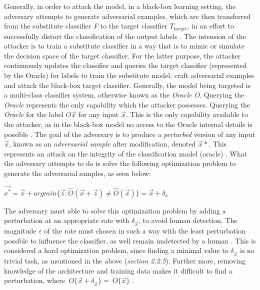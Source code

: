 \documentclass[grad,lot,lof,11pt,oneside,onehalfspace]{RUthesis}
\begin{document}
Generally, in order to attack the model, in a black-box learning setting, the adversary attempts to generate adversarial examples, which are then transferred from the substitute classifier \textit{F} to the target classifier \textit{$T_{target}$}, in an effort to successfully distort the classification of the output labels \cite{hosseini_blocking_2017}. The intension of the attacker is to train a substitute classifier in a way that is to mimic or simulate the decision space of the target classifier. For the latter purpose, the attacker continuously updates the classifier and queries the target classifier (represented by the Oracle) for labels to train the substitute model, craft adversarial examples and attack the black-box target classifier.\newline
Generally, the model being targeted is a multi-class classifier system, otherwise known as the \textit{Oracle O}. Querying the \textit{Oracle} represents the only capability which the attacker possesses. Querying the \textit{Oracle} for the label  $\textit{O}\vec{x}$ for any input $\vec{x}$. This is the only capability available to the attacker, as in the black-box model no access to the Oracle internal details is possible \cite{papernot_practical_2017}. The goal of the adversary is to produce a \textit{perturbed} version of any input $\vec{x}$, known as an \textit{adversarial sample} after modification, denoted $\vec{x}*$. This represents an attack on the integrity of the classification model (oracle) \cite{papernot_practical_2017}. What the adversary attempts to do is solve the following optimization problem to generate the adversarial samples, as seen below:\newline
\centerline{$\vec{x^{*}} = \vec{x} + argmin\{\vec{z}:\hat{O}(\vec{x}+\vec{z})\neq\hat{O}(\vec{x})\}= \vec{x} + \delta_{x}$}
\newline
The adversary must able to solve this optimization problem by adding a perturbation at an appropriate rate with $\delta_{\vec{x}}$, to avoid human detection. The magnitude $\varepsilon$ of the rate must chosen in such a way with the least perturbation possible to influence the classifier, as well remain undetected by a human \cite{papernot_practical_2017}. This is considered a hard optimization problem, since finding a minimal value to $\delta_{\vec{x}}$ is no trivial task, as mentioned in the above (\textit{section 2.2.5}). Further more, removing knowledge of the architecture and training data makes it difficult to find a perturbation, where $~{O}\{\vec{x}+\delta_{\vec{x}}\} = ~{O}\{\vec{x}\}$ \cite{papernot_practical_2017}.
\end{document}
